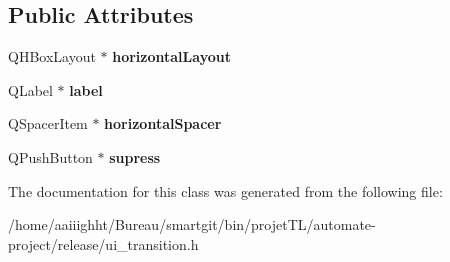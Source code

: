 \subsection*{Public Attributes}
\begin{DoxyCompactItemize}
\item 
\hypertarget{class_ui___transition_a1dca9708b7b32167771a6a6eb4ddd681}{Q\-H\-Box\-Layout $\ast$ {\bfseries horizontal\-Layout}}\label{class_ui___transition_a1dca9708b7b32167771a6a6eb4ddd681}

\item 
\hypertarget{class_ui___transition_a91c54b4226c964665883b2857c2e96e5}{Q\-Label $\ast$ {\bfseries label}}\label{class_ui___transition_a91c54b4226c964665883b2857c2e96e5}

\item 
\hypertarget{class_ui___transition_aa48675c679af3325e8cb26c4b6a8f3e4}{Q\-Spacer\-Item $\ast$ {\bfseries horizontal\-Spacer}}\label{class_ui___transition_aa48675c679af3325e8cb26c4b6a8f3e4}

\item 
\hypertarget{class_ui___transition_a291e72a79a44c3df5fb8c686d565fe88}{Q\-Push\-Button $\ast$ {\bfseries supress}}\label{class_ui___transition_a291e72a79a44c3df5fb8c686d565fe88}

\end{DoxyCompactItemize}


The documentation for this class was generated from the following file\-:\begin{DoxyCompactItemize}
\item 
/home/aaiiighht/\-Bureau/smartgit/bin/projet\-T\-L/automate-\/project/release/ui\-\_\-transition.\-h\end{DoxyCompactItemize}
